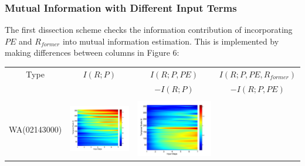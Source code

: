 \documentclass[draft,wrr]{AGUTeX}
\begin{document}
\begin{article}
\subsubsection{Mutual Information with Different Input Terms}
The first dissection scheme checks the information contribution of incorporating $PE$ and $R_{former}$ into mutual information estimation. This is implemented by making differences between columns in Figure 6:
\begin{table}[H]\small
\label{PER}
\centering
\begin{tabular}{cccc}
\hline
Type&$I(R;P)$&$I(R;P,PE) $&$I(R;P,PE,R_{former}) $\\
 & &$ -I(R;P)$&$ -I(R;P,PE)$\\\hline
\\
WA(02143000)
&\begin{minipage}{.3\textwidth}\includegraphics[width=\linewidth]{resultgraph/02143000p.png}\end{minipage}
&\begin{minipage}{.3\textwidth}\includegraphics[width=\linewidth]{resultgraph/02143000diff_ep.png}\end{minipage}

\end{tabular}
\end{table}
\end{article}
\end{document}
